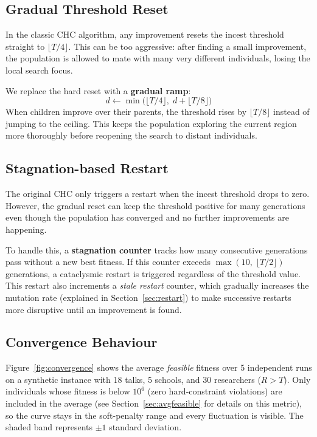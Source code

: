 \documentclass[12pt, a4paper]{article}
\begin{document}
\subsection{Gradual Threshold Reset}

In the classic CHC algorithm, any improvement resets the incest threshold
straight to $\lfloor T/4 \rfloor$. This can be too aggressive: after finding
a small improvement, the population is allowed to mate with many very
different individuals, losing the local search focus.

We replace the hard reset with a \textbf{gradual ramp}:
\begin{equation}
  d \leftarrow \min\bigl(\lfloor T/4 \rfloor,\;
                          d + \lfloor T/8 \rfloor\bigr)
\end{equation}
When children improve over their parents, the threshold rises by
$\lfloor T/8 \rfloor$ instead of jumping to the ceiling. This keeps the
population exploring the current region more thoroughly before reopening
the search to distant individuals.

\subsection{Stagnation-based Restart}

The original CHC only triggers a restart when the incest threshold drops
to zero. However, the gradual reset can keep the threshold positive for many
generations even though the population has converged and no further
improvements are happening.

To handle this, a \textbf{stagnation counter} tracks how many consecutive
generations pass without a new best fitness. If this counter exceeds
$\max(10,\; \lfloor T/2 \rfloor)$ generations, a cataclysmic restart is
triggered regardless of the threshold value. This restart also increments
a \emph{stale restart} counter, which gradually increases the mutation
rate (explained in Section~\ref{sec:restart}) to make successive restarts
more disruptive until an improvement is found.

\subsection{Convergence Behaviour}

Figure~\ref{fig:convergence} shows the average \emph{feasible} fitness over 5
independent runs on a synthetic instance with 18 talks, 5 schools, and 30
researchers ($R > T$). Only individuals whose fitness is below $10^6$ (zero
hard-constraint violations) are included in the average (see
Section~\ref{sec:avgfeasible} for details on this metric), so the curve stays in
the soft-penalty range and every fluctuation is visible. The shaded band
represents $\pm 1$ standard deviation.
\end{document}
